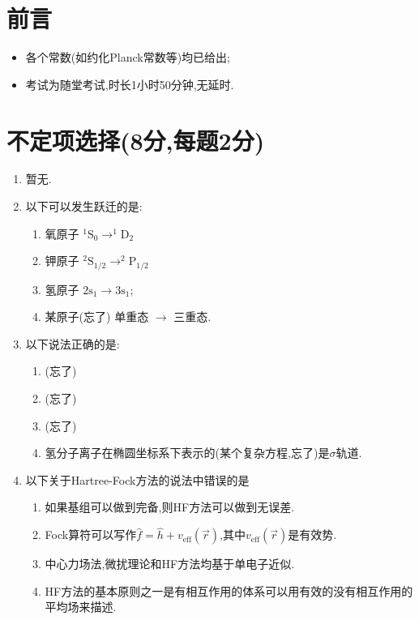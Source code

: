 \documentclass{ctexart}
\author{Glimmerium, NightisYoung}
\date{}
\title{\tbf{2026年结构化学挑战班期中考试\ 参考解答}}
\begin{document}
\pagestyle{empty}
\maketitle
\section*{前言}
\begin{itemize}
    \item 各个常数(如约化Planck常数等)均已给出;
    \item 考试为随堂考试,时长1小时50分钟,无延时.
\end{itemize}
\section{不定项选择(8分,每题2分)}
\begin{enumerate}[label=\tbf{\arabic*.}]
    \item 暂无.
    \item 以下可以发生跃迁的是:
        \begin{enumerate}[label=\Alph*.]
            \item 氧原子 $^1\text{S}_0 \rightarrow ^1\text{D}_2$
            \item 钾原子 $^2\text{S}_{1/2} \rightarrow ^2\text{P}_{1/2}$
            \item 氢原子 $2\text{s}_{1}\rightarrow 3\text{s}_{1}$;
            \item 某原子(忘了) 单重态 $\rightarrow$ 三重态.
        \end{enumerate}
    \item 以下说法正确的是:
        \begin{enumerate}[label=\Alph*.]
            \item (忘了)
            \item (忘了)
            \item (忘了)
            \item 氢分子离子在椭圆坐标系下表示的(某个复杂方程,忘了)是$\sigma$轨道.
        \end{enumerate}
    \item 以下关于Hartree-Fock方法的说法中错误的是
        \begin{enumerate}[label=\Alph*.]
            \item 如果基组可以做到完备,则HF方法可以做到无误差.
            \item Fock算符可以写作$\hat{f}=\hat{h}+v_{\text{eff}}(\vec{r})$,其中$v_{\text{eff}}(\vec{r})$是有效势.
            \item 中心力场法,微扰理论和HF方法均基于单电子近似.
            \item HF方法的基本原则之一是有相互作用的体系可以用有效的没有相互作用的平均场来描述.
        \end{enumerate}
\end{enumerate}
\end{document}
